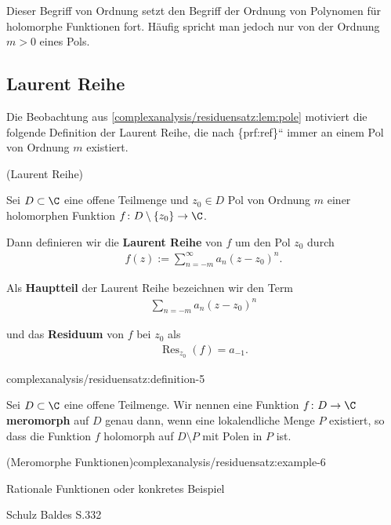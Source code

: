 \documentclass[letterpaper,10pt,german]{jupyterBook}
\begin{document}
\par
Dieser Begriff von Ordnung setzt den Begriff der Ordnung von Polynomen für holomorphe Funktionen fort.
Häufig spricht man jedoch nur von der Ordnung \(m > 0\) eines Pols.


\subsection{Laurent Reihe}
\label{\detokenize{complexanalysis/residuensatz:laurent-reihe}}
\par
Die Beobachtung aus \cref{complexanalysis/residuensatz:lem:pole} motiviert die folgende Definition der Laurent Reihe, die nach \{prf:ref\}`` immer an einem Pol von Ordnung \(m\) existiert.
\label{complexanalysis/residuensatz:definition-4}
\begin{emphBox}{}{}{ (Laurent Reihe)}



\par
Sei \(D \subset \C\) eine offene Teilmenge und \(z_0 \in D\) Pol von Ordnung \(m\) einer holomorphen Funktion \(f \colon D \setminus \{z_0\} \rightarrow \C\).

\par
Dann definieren wir die \textbf{Laurent Reihe} von \(f\) um den Pol \(z_0\) durch
\begin{align*}
f(z) := \sum_{n=-m}^\infty a_n (z-z_0)^n.
\end{align*}
\par
Als \textbf{Hauptteil} der Laurent Reihe bezeichnen wir den Term
\begin{align*}
\sum_{n=-m} a_n (z-z_0)^n
\end{align*}
\par
und das \textbf{Residuum} von \(f\) bei \(z_0\) als
\begin{align*}
\operatorname{Res}_{z_0}(f) = a_{-1}.
\end{align*}\begin{definition}{}{complexanalysis/residuensatz:definition-5}



\par
Sei \(D \subset \C\) eine offene Teilmenge.
Wir nennen eine Funktion \(f \colon D \rightarrow \C\) \textbf{meromorph} auf \(D\) genau dann, wenn eine lokalendliche Menge \(P\) existiert, so dass die Funktion \(f\) holomorph auf \(D \setminus P\) mit Polen in \(P\) ist.
\end{definition}
\end{emphBox}
\begin{example}{(Meromorphe Funktionen)}{complexanalysis/residuensatz:example-6}



\par
Rationale Funktionen oder konkretes Beispiel

\par
Schulz Baldes S.332
\end{example}
\end{document}
